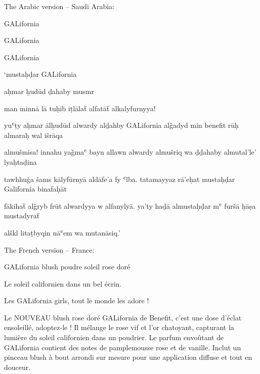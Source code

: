 \documentclass[output=paper]{langsci/langscibook}
\begin{document}
The Arabic version – Saudi Arabia:

\begin{center}

  GALifornia 



   GALifornia 

  GALifornia 

\end{center}

\begin{center}
  ‘mustaḥḍar GALifornia

  aḥmar ẖudūd ḏahaby musmr

  man minnā lā tuḥib iṭlālaẗ alfatāẗ alkalyfurnyya!

  yuʿṭy aḥmar ālẖudūd alwardy alḏahby GALifornia alǧadyd min benefit rūḥ almaraḥ wal išrāqa

  almušmisa! innahu yaǧmaʿ bayn allawn alwardy almušriq wa ḏḏahaby almutal'le' lyaḥtaḍina

  tawhhuǧa šams kālyfūrnyā aldāfe'a fy ʿlba. tatamayyaz rā'eḥat mustaḥḍar Galifornia binafaḥāt

  fākihaẗ alǧryb frūt alwardyya w alfanylyā. ya'ty haḏā almustaḥḍar mʿ furšā ẖāṣa mustadyraẗ

  alškl litaṭbyqin nāʿem wa mutanāsiq.’
\end{center}

The French version – France:

\begin{center}
  GALifornia {\textbar} blush poudre soleil rose doré

  Le soleil californien dans un bel écrin.

  Les GALifornia girls, tout le monde les adore !

  Le NOUVEAU blush rose doré GALifornia de Benefit, c'est une dose d'éclat ensoleillé, adoptez-le ! Il mélange le rose vif et l'or chatoyant, capturant la lumière du soleil californien dans un poudrier. Le parfum envoûtant de GALifornia contient des notes de pamplemousse rose et de vanille. Inclut un pinceau blush à bout arrondi sur mesure pour une application diffuse et tout en douceur.
\end{center}
\end{document}
